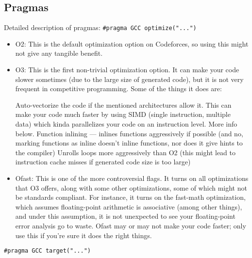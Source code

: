 	\subsection{Pragmas}
		Detailed description of pragmas:
		\lstinline{#pragma GCC optimize("...")}
		\begin{itemize}
			\item O2: This is the default optimization option on Codeforces, so using this might not give any tangible benefit.
			\item O3: This is the first non-trivial optimization option. It can make your code slower sometimes (due to the large size of generated code), but it is not very frequent in competitive programming. Some of the things it does are:

					Auto-vectorize the code if the mentioned architectures allow it. This can make your code much faster by using SIMD (single instruction, multiple data) which kinda parallelizes your code on an instruction level. More info below.
					Function inlining — inlines functions aggressively if possible (and no, marking functions as inline doesn't inline functions, nor does it give hints to the compiler)
					Unrolls loops more aggressively than O2 (this might lead to instruction cache misses if generated code size is too large)

			\item Ofast: This is one of the more controversial flags. It turns on all optimizations that O3 offers, along with some other optimizations, some of which might not be standards compliant. For instance, it turns on the fast-math optimization, which assumes floating-point arithmetic is associative (among other things), and under this assumption, it is not unexpected to see your floating-point error analysis go to waste. Ofast may or may not make your code faster; only use this if you're sure it does the right things.
		\end{itemize}
		\lstinline{#pragma GCC target("...")}

